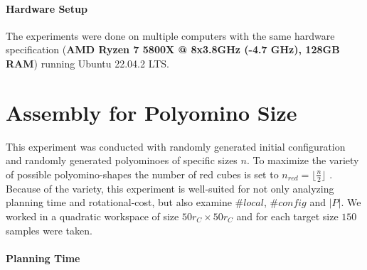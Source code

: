\paragraph{Hardware Setup}
The experiments were done on multiple computers with the same hardware specification (\textbf{AMD Ryzen 7 5800X @ 8x3.8GHz (-4.7 GHz), 128GB RAM}) running Ubuntu 22.04.2 LTS.





\section{Assembly for Polyomino Size}
\label{sec:AFN}

This experiment was conducted with randomly generated initial configuration and randomly generated polyominoes of specific sizes $n$.
To maximize the variety of possible polyomino-shapes the number of red cubes is set to $n_\textit{red} = \lfloor \frac{n}{2} \rfloor$ \cite{Lu2021}.
Because of the variety, this experiment is well-suited for not only analyzing planning time and rotational-cost, but also examine $\#\textit{local}$, $\#\textit{config}$ and $|P|$.
We worked in a quadratic workspace of size $50 r_C \times 50 r_C$ and for each target size $150$ samples were taken.

\paragraph{Planning Time}

